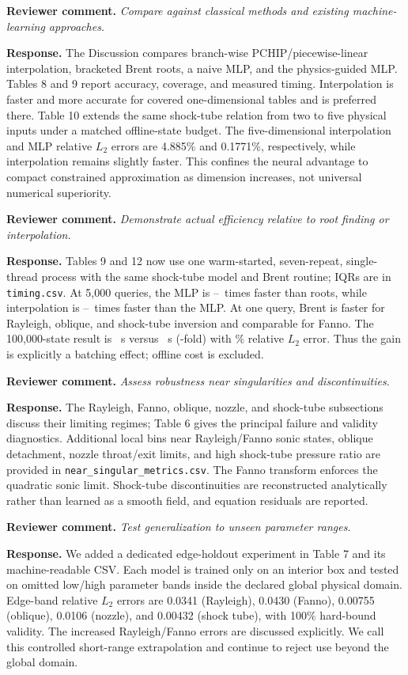 \documentclass[11pt]{article}
\newcommand{\comment}[1]{\par\medskip\noindent\textbf{Reviewer comment.} \emph{#1}\par}
\newcommand{\response}[1]{\par\noindent\textcolor{responseblue}{\textbf{Response.} #1}\par\medskip}
\begin{document}
\comment{Compare against classical methods and existing machine-learning approaches.}
\response{The Discussion compares branch-wise PCHIP/piecewise-linear interpolation, bracketed Brent roots, a naive MLP, and the physics-guided MLP. Tables 8 and 9 report accuracy, coverage, and measured timing. Interpolation is faster and more accurate for covered one-dimensional tables and is preferred there. Table 10 extends the same shock-tube relation from two to five physical inputs under a matched offline-state budget. The five-dimensional interpolation and MLP relative $L_2$ errors are 4.885\% and 0.1771\%, respectively, while interpolation remains slightly faster. This confines the neural advantage to compact constrained approximation as dimension increases, not universal numerical superiority.}

\comment{Demonstrate actual efficiency relative to root finding or interpolation.}
\response{Tables 9 and 12 now use one warm-started, seven-repeat, single-thread process with the same shock-tube model and Brent routine; IQRs are in \texttt{timing.csv}. At 5,000 queries, the MLP is \TimingRootSpeedMin--\TimingRootSpeedMax\ times faster than roots, while interpolation is \TimingInterpSpeedMin--\TimingInterpSpeedMax\ times faster than the MLP. At one query, Brent is faster for Rayleigh, oblique, and shock-tube inversion and comparable for Fanno. The 100,000-state result is \TimingWorkloadBrentSeconds~s versus \TimingWorkloadMlpSeconds~s (\TimingWorkloadSpeedup-fold) with \TimingWorkloadRelLtwoPercent\% relative $L_2$ error. Thus the gain is explicitly a batching effect; offline cost is excluded.}

\comment{Assess robustness near singularities and discontinuities.}
\response{The Rayleigh, Fanno, oblique, nozzle, and shock-tube subsections discuss their limiting regimes; Table 6 gives the principal failure and validity diagnostics. Additional local bins near Rayleigh/Fanno sonic states, oblique detachment, nozzle throat/exit limits, and high shock-tube pressure ratio are provided in \texttt{near\_singular\_metrics.csv}. The Fanno transform enforces the quadratic sonic limit. Shock-tube discontinuities are reconstructed analytically rather than learned as a smooth field, and equation residuals are reported.}

\comment{Test generalization to unseen parameter ranges.}
\response{We added a dedicated edge-holdout experiment in Table 7 and its machine-readable CSV. Each model is trained only on an interior box and tested on omitted low/high parameter bands inside the declared global physical domain. Edge-band relative $L_2$ errors are 0.0341 (Rayleigh), 0.0430 (Fanno), 0.00755 (oblique), 0.0106 (nozzle), and 0.00432 (shock tube), with 100\% hard-bound validity. The increased Rayleigh/Fanno errors are discussed explicitly. We call this controlled short-range extrapolation and continue to reject use beyond the global domain.}
\end{document}
